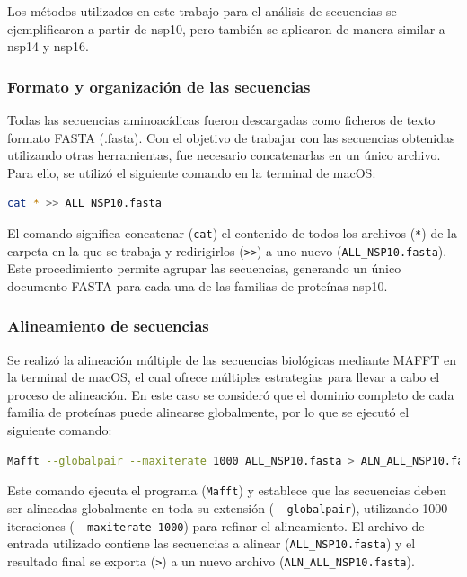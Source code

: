 Los métodos utilizados en este trabajo para el análisis de secuencias se 
ejemplificaron a partir de nsp10, pero también se aplicaron de manera 
similar a nsp14 y nsp16.

\subsubsection{Formato y organización de las secuencias}

Todas las secuencias aminoacídicas fueron descargadas como ficheros de texto
formato FASTA (.fasta). Con el objetivo de trabajar con las secuencias 
obtenidas utilizando otras herramientas, fue necesario concatenarlas en un 
único archivo. Para ello, se utilizó el siguiente comando en la terminal de 
macOS:\@

\begin{lstlisting}[language=bash]
 cat * >> ALL_NSP10.fasta 
\end{lstlisting}

El comando significa concatenar (\lstinline!cat!) el contenido de todos los 
archivos (\lstinline!*!) de la carpeta en la que se trabaja y redirigirlos 
(\lstinline!>>!) a uno nuevo (\lstinline!ALL_NSP10.fasta!). Este 
procedimiento permite agrupar las secuencias, generando un único documento 
FASTA para cada una de las familias de proteínas nsp10.

\subsubsection{Alineamiento de secuencias}

Se realizó la alineación múltiple de las secuencias biológicas mediante 
MAFFT en la terminal de macOS, el cual ofrece múltiples estrategias para 
llevar a cabo el proceso de alineación. En este caso se consideró que el 
dominio completo de cada familia de proteínas puede alinearse globalmente, 
por lo que se ejecutó el siguiente comando:

\begin{lstlisting}[language=bash]
 Mafft --globalpair --maxiterate 1000 ALL_NSP10.fasta > ALN_ALL_NSP10.fasta
\end{lstlisting}

Este comando ejecuta el programa (\lstinline!Mafft!) y establece que las 
secuencias deben ser alineadas globalmente en toda su extensión 
(\lstinline!--globalpair!), utilizando 1000 iteraciones 
(\lstinline!--maxiterate 1000!) para refinar el alineamiento. El archivo de 
entrada utilizado contiene las secuencias a alinear 
(\lstinline!ALL_NSP10.fasta!) y el resultado final se exporta 
(\lstinline!>!) a un nuevo archivo (\lstinline!ALN_ALL_NSP10.fasta!).

